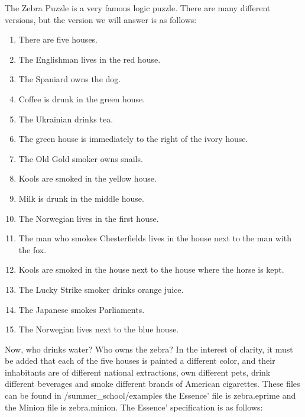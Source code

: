 \documentclass[oneside]{book}
\begin{document}
The Zebra Puzzle is a very famous logic puzzle. There are many different versions, but the version we will answer is as follows:
\begin{enumerate}
\item There are five houses.
\item The Englishman lives in the red house.
\item The Spaniard owns the dog.
\item Coffee is drunk in the green house.
\item The Ukrainian drinks tea.
\item The green house is immediately to the right of the ivory house.
\item The Old Gold smoker owns snails.
\item Kools are smoked in the yellow house.
\item Milk is drunk in the middle house.
\item The Norwegian lives in the first house.
\item The man who smokes Chesterfields lives in the house next to the man with the fox.
\item Kools are smoked in the house next to the house where the horse is kept.
\item The Lucky Strike smoker drinks orange juice.
\item The Japanese smokes Parliaments.
\item The Norwegian lives next to the blue house.
\end{enumerate}
Now, who drinks water? Who owns the zebra? In the interest of clarity, it must be added that each of the five houses is painted a different color, and their inhabitants are of different national extractions, own different pets, drink different beverages and smoke different brands of American cigarettes.  These files can be found in /summer\_school/examples the Essence' file is zebra.eprime and the Minion file is zebra.minion. The Essence' specification is as follows:
\end{document}
